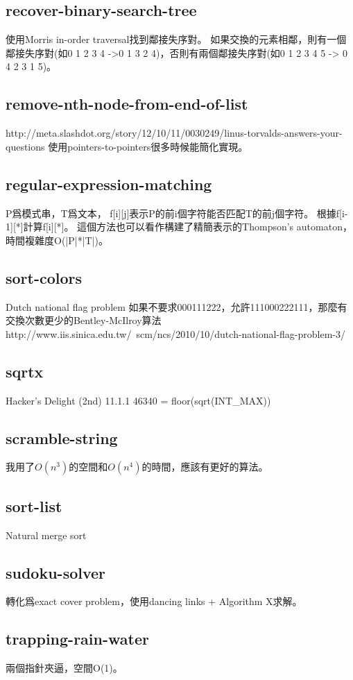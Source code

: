\subsection{recover-binary-search-tree}
使用Morris in-order traversal找到鄰接失序對。
如果交換的元素相鄰，則有一個鄰接失序對(如0 1 2 3 4 ->0 1 3 2 4)，否則有兩個鄰接失序對(如0 1 2 3 4 5 -> 0 4 2 3 1 5)。
\subsection{remove-nth-node-from-end-of-list}
http://meta.slashdot.org/story/12/10/11/0030249/linus-torvalds-answers-your-questions
使用pointers-to-pointers很多時候能簡化實現。
\subsection{regular-expression-matching}
P爲模式串，T爲文本， f[i][j]表示P的前i個字符能否匹配T的前j個字符。 根據f[i-1][*]計算f[i][*]。 這個方法也可以看作構建了精簡表示的Thompson's automaton，時間複雜度O(|P|*|T|)。
\subsection{sort-colors}
Dutch national flag problem 如果不要求000111222，允許111000222111，那麼有交換次數更少的Bentley-McIlroy算法 http://www.iis.sinica.edu.tw/~scm/ncs/2010/10/dutch-national-flag-problem-3/
\subsection{sqrtx}
Hacker's Delight (2nd) 11.1.1 46340 = floor(sqrt(INT_MAX))
\subsection{scramble-string}
我用了$O(n^3)$的空間和$O(n^4)$的時間，應該有更好的算法。
\subsection{sort-list}
Natural merge sort
\subsection{sudoku-solver}
轉化爲exact cover problem，使用dancing links + Algorithm X求解。
\subsection{trapping-rain-water}
兩個指針夾逼，空間O(1)。
